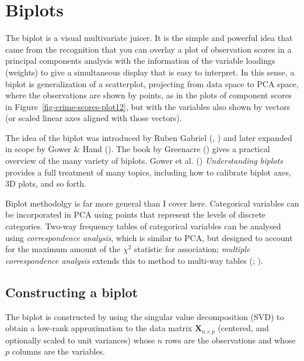\documentclass[
  letterpaper,
  10pt,
  krantz2]{krantz}
\begin{document}
\section{Biplots}\label{sec-biplot}

The biplot is a visual multivariate juicer. It is the simple and
powerful idea that came from the recognition that you can overlay a plot
of observation scores in a principal components analysis with the
information of the variable loadings (weights) to give a simultaneous
display that is easy to interpret. In this sense, a biplot is
generalization of a scatterplot, projecting from data space to PCA
space, where the observations are shown by points, as in the plots of
component scores in Figure~\ref{fig-crime-scores-plot12}, but with the
variables also shown by vectors (or scaled linear axes aligned with
those vectors).

The idea of the biplot was introduced by Ruben Gabriel
(, ) and
later expanded in scope by Gower \& Hand
(). The book by Greenacre
() gives a practical overview
of the many variety of biplots. Gower et al.
() \emph{Understanding biplots}
provides a full treatment of many topics, including how to calibrate
biplot axes, 3D plots, and so forth.

Biplot methodolgy is far more general than I cover here. Categorical
variables can be incorporated in PCA using points that represent the
levels of discrete categories. Two-way frequency tables of categorical
variables can be analysed using \emph{correspondence analysis}, which is
similar to PCA, but designed to account for the maximum amount of the
\(\chi^2\) statistic for association; \emph{multiple correspondence
analysis} extends this to method to multi-way tables
(;
).

\subsection{Constructing a biplot}\label{constructing-a-biplot}

The biplot is constructed by using the singular value decomposition
(SVD) to obtain a low-rank approximation to the data matrix
\(\mathbf{X}_{n \times p}\) (centered, and optionally scaled to unit
variances) whose \(n\) rows are the observations and whose \(p\) columns
are the variables.
\end{document}
